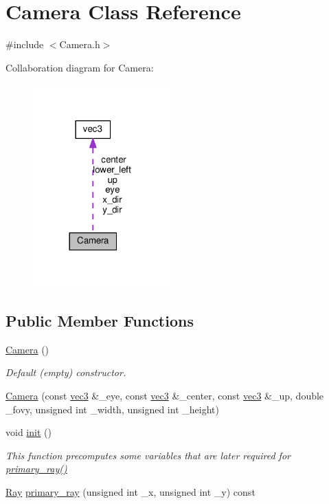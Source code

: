 \hypertarget{classCamera}{}\section{Camera Class Reference}
\label{classCamera}


{\ttfamily \#include $<$Camera.\+h$>$}



Collaboration diagram for Camera\+:
\nopagebreak
\begin{figure}[H]
\begin{center}
\leavevmode
\includegraphics[width=149pt]{classCamera__coll__graph}
\end{center}
\end{figure}
\subsection*{Public Member Functions}
\begin{DoxyCompactItemize}
\item 
\hyperlink{classCamera_a01f94c3543f56ede7af49dc778f19331}{Camera} ()
\begin{DoxyCompactList}\small\item\em Default (empty) constructor. \end{DoxyCompactList}\item 
\hyperlink{classCamera_ab1d4ceca18bb3143f89b19c2de5bccc4}{Camera} (const \hyperlink{classvec3}{vec3} \&\+\_\+eye, const \hyperlink{classvec3}{vec3} \&\+\_\+center, const \hyperlink{classvec3}{vec3} \&\+\_\+up, double \+\_\+fovy, unsigned int \+\_\+width, unsigned int \+\_\+height)
\item 
void \hyperlink{classCamera_af930ce1f46c9f5af3bd5e5bbff6b5022}{init} ()
\begin{DoxyCompactList}\small\item\em This function precomputes some variables that are later required for \hyperlink{classCamera_abc4c25528b318dabadc65e83a4052534}{primary\+\_\+ray()} \end{DoxyCompactList}\item 
\hyperlink{classRay}{Ray} \hyperlink{classCamera_abc4c25528b318dabadc65e83a4052534}{primary\+\_\+ray} (unsigned int \+\_\+x, unsigned int \+\_\+y) const 
\end{DoxyCompactItemize}
